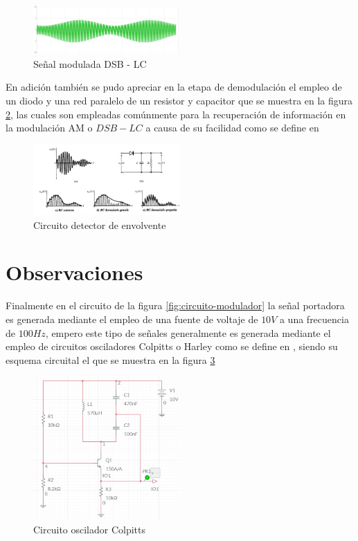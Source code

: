 \documentclass[conference]{IEEEtran}
\begin{document}
	\begin{figure}[h]
		\centering
		\includegraphics[width=0.5\textwidth]{media/senial-modulada}
		\caption{Señal modulada DSB - LC}
		\label{fig:senial-modulada}
	\end{figure}
	
	En adición también se pudo apreciar en la etapa de demodulación el empleo de un diodo y una red paralelo de un resistor y capacitor que se muestra en la figura \ref{fig:detector-envolvente}, las cuales son empleadas comúnmente para la recuperación de información en la modulación AM o $DSB - LC$ a causa de su facilidad como se define en \cite{stremler2006}
	
	\begin{figure}[h]
		\centering
		\includegraphics[width=0.5\textwidth]{media/detector-envolvente}
		\caption{Circuito detector de envolvente}
		\label{fig:detector-envolvente}
	\end{figure}
	
	
	\section{Observaciones}
	
	Finalmente en el circuito de la figura \ref{fig:circuito-modulador} la señal portadora es generada mediante el empleo de una fuente de voltaje de $10 V$ a una frecuencia de $100 Hz$, empero este tipo de señales generalmente es generada mediante el empleo de circuitos osciladores Colpitts o Harley como se define en \cite{tomasi_comunicaciones}, siendo su esquema circuital el que se muestra en la figura \ref{fig:oscilador-colpitts}
	
	\begin{figure}[h]
		\centering
		\includegraphics[width=0.5\textwidth]{media/oscilador-colpitts}
		\caption{Circuito oscilador Colpitts}
		\label{fig:oscilador-colpitts}
	\end{figure}
	
\end{document}
